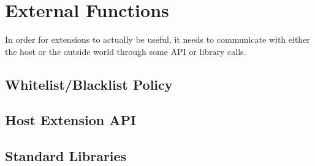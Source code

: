 \chapter {External Functions}

In order for extensions to actually be useful, it needs to communicate with
either the host or the outside world through some API or library calls.

\section {Whitelist/Blacklist Policy}



\section {Host Extension API}

\section {Standard Libraries}

